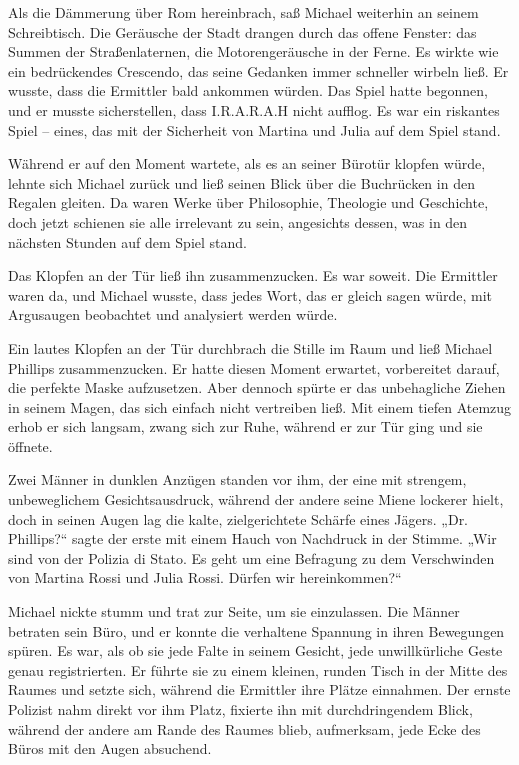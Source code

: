 \documentclass[
]{article}
\begin{document}
Als die Dämmerung über Rom hereinbrach, saß Michael weiterhin an seinem
Schreibtisch. Die Geräusche der Stadt drangen durch das offene Fenster:
das Summen der Straßenlaternen, die Motorengeräusche in der Ferne. Es
wirkte wie ein bedrückendes Crescendo, das seine Gedanken immer
schneller wirbeln ließ. Er wusste, dass die Ermittler bald ankommen
würden. Das Spiel hatte begonnen, und er musste sicherstellen, dass
I.R.A.R.A.H nicht aufflog. Es war ein riskantes Spiel -- eines, das mit
der Sicherheit von Martina und Julia auf dem Spiel stand.

Während er auf den Moment wartete, als es an seiner Bürotür klopfen
würde, lehnte sich Michael zurück und ließ seinen Blick über die
Buchrücken in den Regalen gleiten. Da waren Werke über Philosophie,
Theologie und Geschichte, doch jetzt schienen sie alle irrelevant zu
sein, angesichts dessen, was in den nächsten Stunden auf dem Spiel
stand.

Das Klopfen an der Tür ließ ihn zusammenzucken. Es war soweit. Die
Ermittler waren da, und Michael wusste, dass jedes Wort, das er gleich
sagen würde, mit Argusaugen beobachtet und analysiert werden würde.

Ein lautes Klopfen an der Tür durchbrach die Stille im Raum und ließ
Michael Phillips zusammenzucken. Er hatte diesen Moment erwartet,
vorbereitet darauf, die perfekte Maske aufzusetzen. Aber dennoch spürte
er das unbehagliche Ziehen in seinem Magen, das sich einfach nicht
vertreiben ließ. Mit einem tiefen Atemzug erhob er sich langsam, zwang
sich zur Ruhe, während er zur Tür ging und sie öffnete.

Zwei Männer in dunklen Anzügen standen vor ihm, der eine mit strengem,
unbeweglichem Gesichtsausdruck, während der andere seine Miene lockerer
hielt, doch in seinen Augen lag die kalte, zielgerichtete Schärfe eines
Jägers. „Dr. Phillips?{\kern0pt}`` sagte der erste mit einem Hauch von
Nachdruck in der Stimme. „Wir sind von der Polizia di Stato. Es geht um
eine Befragung zu dem Verschwinden von Martina Rossi und Julia Rossi.
Dürfen wir hereinkommen?{\kern0pt}``

Michael nickte stumm und trat zur Seite, um sie einzulassen. Die Männer
betraten sein Büro, und er konnte die verhaltene Spannung in ihren
Bewegungen spüren. Es war, als ob sie jede Falte in seinem Gesicht, jede
unwillkürliche Geste genau registrierten. Er führte sie zu einem
kleinen, runden Tisch in der Mitte des Raumes und setzte sich, während
die Ermittler ihre Plätze einnahmen. Der ernste Polizist nahm direkt vor
ihm Platz, fixierte ihn mit durchdringendem Blick, während der andere am
Rande des Raumes blieb, aufmerksam, jede Ecke des Büros mit den Augen
absuchend.
\end{document}
